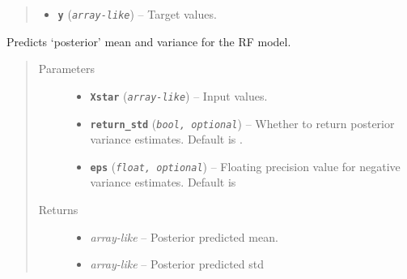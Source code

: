 \documentclass[letterpaper,10pt,english]{sphinxmanual}
\begin{document}
\begin{fulllineitems}
\begin{fulllineitems}
\begin{quote}
\begin{description}
\begin{itemize}
\item {} 
\textbf{\texttt{y}} (\emph{\texttt{array-like}}) -- Target values.

\end{itemize}

\end{description}\end{quote}

\end{fulllineitems}


\begin{fulllineitems}
\label{pyGPGO.surrogates.RandomForest:pyGPGO.surrogates.RandomForest.RandomForest.predict}
Predicts `posterior' mean and variance for the RF model.
\begin{quote}\begin{description}
\item[{Parameters}] \leavevmode\begin{itemize}
\item {} 
\textbf{\texttt{Xstar}} (\emph{\texttt{array-like}}) -- Input values.

\item {} 
\textbf{\texttt{return\_std}} (\emph{\texttt{bool, optional}}) -- Whether to return posterior variance estimates. Default is .

\item {} 
\textbf{\texttt{eps}} (\emph{\texttt{float, optional}}) -- Floating precision value for negative variance estimates. Default is 

\end{itemize}

\item[{Returns}] \leavevmode
\begin{itemize}
\item {} 
\emph{array-like} -- Posterior predicted mean.

\item {} 
\emph{array-like} -- Posterior predicted std

\end{itemize}


\end{description}\end{quote}

\end{fulllineitems}


\end{fulllineitems}
\end{document}
